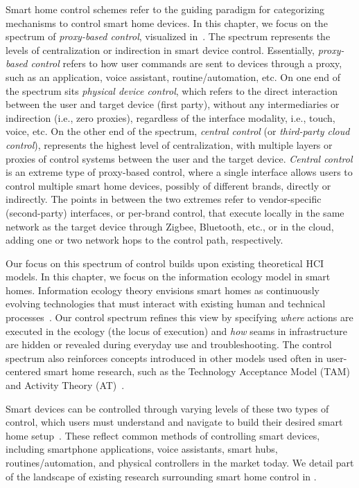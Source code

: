 Smart home control schemes refer to the guiding paradigm for categorizing mechanisms to control smart home devices.
{
In this chapter, we focus on the spectrum of \textit{proxy-based control}, visualized in~. The spectrum represents the levels of centralization or indirection in smart device control. Essentially, \textit{proxy-based control} refers to how user commands are sent to devices through a proxy, such as an application, voice assistant, routine/automation, etc.
On one end of the spectrum sits \textit{physical device control}, which refers to the direct interaction between the user and target device  (first party), without any intermediaries or indirection (i.e., zero proxies), regardless of the interface modality, i.e., touch, voice, etc.
On the other end of the spectrum, \textit{central control} (or \textit{third-party cloud control}), represents the highest level of centralization, with multiple layers or proxies of control systems between the user and the target device. \textit{Central control} is an extreme type of proxy-based control, where a single interface allows users to control multiple smart home devices, possibly of different brands, directly or indirectly.
The points in between the two extremes refer to vendor-specific (second-party) interfaces, or per-brand control, that execute locally in the same network as the target device through Zigbee, Bluetooth, etc., or in the cloud, adding one or two network hops to the control path, respectively.
}

{Our focus on this spectrum of control builds upon existing theoretical HCI models. In this chapter, we focus on the information ecology model in smart homes. Information ecology theory envisions smart homes as continuously evolving technologies that must interact with existing human and technical processes~\cite{wang2021connecting, huang2023research, 8130821}. Our control spectrum refines this view by specifying \textit{where} actions are executed in the ecology (the locus of execution) and \textit{how} seams in infrastructure are hidden or revealed during everyday use and troubleshooting. The control spectrum also reinforces concepts introduced in other models used often in user-centered smart home research, such as the Technology Acceptance Model (TAM)~\cite{davis1989technology, shuhaiber2019understanding, zhou2024study, tak2023framework} and Activity Theory (AT)~\cite{kaptelinin2012activity, demeure2014activity, maier2023analysing}.} 

Smart devices can be controlled through varying levels of these two types of control, which users must understand and navigate to build their desired smart home setup~\cite{wozniak2023inhabiting}.
These reflect common methods of controlling smart devices, including smartphone applications, voice assistants, smart hubs, routines/automation, and physical controllers in the market today. We detail part of the landscape of existing research surrounding smart home control in .

